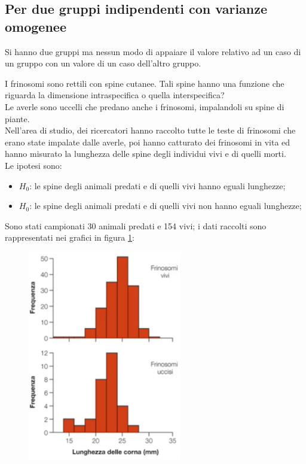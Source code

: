 \documentclass[10pt, draft]{book}
\newcounter{example}[section]
\begin{document}
\subsection{Per due gruppi indipendenti con varianze omogenee}
Si hanno due gruppi ma nessun modo di appaiare il valore relativo ad un caso di un gruppo con un valore di un caso dell'altro gruppo.
\begin{example}\label{esfrinosomi}
    I frinosomi sono rettili con spine cutanee. Tali spine hanno una funzione che riguarda la dimensione intraspecifica o quella interspecifica?
    \\
    Le averle sono uccelli che predano anche i frinosomi, impalandoli su spine di piante.
    \\
    Nell'area di studio, dei ricercatori hanno raccolto tutte le teste di frinosomi che erano state impalate dalle averle, poi hanno catturato dei frinosomi in vita ed hanno misurato la lunghezza delle spine degli individui vivi e di quelli morti.
    \\
    Le ipotesi sono:
    \begin{itemize}
        \item $H_0$: le spine degli animali predati e di quelli vivi hanno eguali lunghezze;
        \item $H_0$: le spine degli animali predati e di quelli vivi non hanno eguali lunghezze;
    \end{itemize}
    Sono stati campionati 30 animali predati e 154 vivi; i dati raccolti sono rappresentati nei grafici in figura \ref{fig12.3-1}:
    \begin{figure}[H]\label{fig12.3-1}
        \centering
        \includegraphics[width=0.6\textwidth]{fig12.3-1}

\end{figure}
\end{example}
\end{document}
